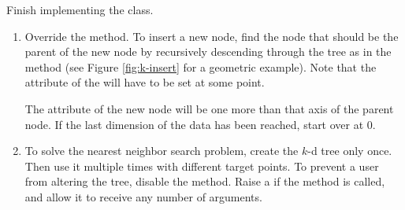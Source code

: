 \begin{problem} %
Finish implementing the  class.
\begin{enumerate}
\item Override the  method.
To insert a new node, find the node that should be the parent of the new node by recursively descending through the tree as in the  method (see Figure \ref{fig:k-insert} for a geometric example).
Note that the  attribute of the will have to be set at some point.

The  attribute of the new node will be one more than that axis of the parent node.
If the last dimension of the data has been reached, start  over at 0.

\item To solve the nearest neighbor search problem, create the $k$-d tree only once.
Then use it multiple times with different target points.
To prevent a user from altering the tree, disable the  method.
Raise a  if the method is called, and allow it to receive any number of arguments.
\end{enumerate}
\end{problem}

